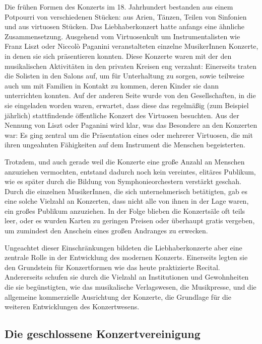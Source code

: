 \documentclass[a4paper, german, oneside]{scrbook}
\begin{document}
Die frühen Formen des Konzerts im 18. Jahrhundert bestanden aus einem Potpourri von verschiedenen Stücken: aus Arien, Tänzen, Teilen von Sinfonien und aus virtuosen Stücken. Das Liebhaberkonzert hatte anfangs eine ähnliche Zusammensetzung. Ausgehend vom Virtuosenkult um Instrumentalisten wie Franz Liszt oder Niccolò Paganini veranstalteten einzelne MusikerInnen Konzerte, in denen sie sich präsentieren konnten. Diese Konzerte waren mit der den musikalischen Aktivitäten in den privaten Kreisen eng verzahnt: Einerseits traten die Solisten in den Salons auf, um für Unterhaltung zu sorgen, sowie teilweise auch um mit Familien in Kontakt zu kommen, deren Kinder sie dann unterrichten konnten. Auf der anderen Seite wurde von den Gesellschaften, in die sie eingeladen worden waren, erwartet, dass diese das regelmäßig (zum Beispiel jährlich) stattfindende öffentliche Konzert des Virtuosen besuchten. Aus der Nennung von Liszt oder Paganini wird klar, was das Besondere an den Konzerten war: Es ging zentral um die Präsentation eines oder mehrerer Virtuosen, die mit ihren ungeahnten Fähigkeiten auf dem Instrument die Menschen begeisterten. \parencite[vgl.][24]{weber_music_2004}

Trotzdem, und auch gerade weil die Konzerte eine große Anzahl an Menschen anzuziehen vermochten, entstand dadurch noch kein vereintes, elitäres Publikum, wie es später durch die Bildung von Symphonieorchestern verstärkt geschah. Durch die einzelnen MusikerInnen, die sich unternehmerisch betätigten, gab es eine solche Vielzahl an Konzerten, dass nicht alle von ihnen in der Lage waren, ein großes Publikum anzuziehen. In der Folge blieben die Konzertsäle oft teils leer, oder es wurden Karten zu geringen Preisen oder überhaupt gratis vergeben, um zumindest den Anschein eines großen Andranges zu erwecken. \parencite[vgl.][49ff.]{weber_music_2004}

Ungeachtet dieser Einschränkungen bildeten die Liebhaberkonzerte aber eine zentrale Rolle in der Entwicklung des modernen Konzerts. Einerseits legten sie den Grundstein für Konzertformen wie das heute praktizierte Recital. Andererseits schufen sie durch die Vielzahl an Institutionen und Gewohnheiten die sie begünstigten, wie das musikalische Verlagswesen, die Musikpresse, und die allgemeine kommerzielle Ausrichtung der Konzerte, die Grundlage für die weiteren Entwicklungen des Konzertwesens.

\subsection{Die geschlossene Konzertvereinigung}
\label{konzertvereinigung}
\end{document}
